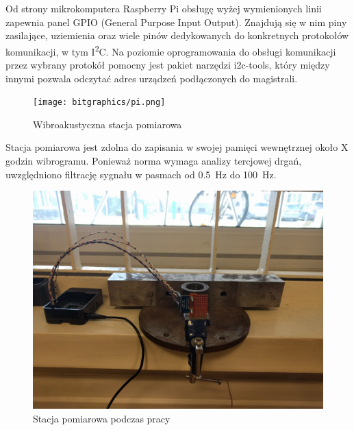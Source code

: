 \documentclass[a4paper,12pt]{mwart}
\begin{document}
Od strony mikrokomputera Raspberry Pi obsługę wyżej wymienionych linii zapewnia
panel GPIO (General Purpose Input Output). Znajdują się w nim piny zasilające,
uziemienia oraz wiele pinów dedykowanych do konkretnych protokołów komunikacji,
w tym I\textsuperscript{2}C. Na poziomie oprogramowania do obsługi komunikacji
przez wybrany protokół pomocny jest pakiet narzędzi
{\fontfamily{\ttdefault}\selectfont i2c-tools}, który między innymi pozwala
odczytać adres urządzeń podłączonych do magistrali.

\begin{figure}[H]
  \centering
  \texttt{[image: bitgraphics/pi.png]}
  \caption{Wibroakustyczna stacja pomiarowa}
  \label{fig:foto}
\end{figure}

Stacja pomiarowa jest zdolna do zapisania w swojej pamięci wewnętrznej około X
godzin wibrogramu. Ponieważ norma wymaga analizy tercjowej drgań, uwzględniono
filtrację sygnału w pasmach od \SI{0,5}{\hertz} do \SI{100}{\hertz}.

\begin{figure}[H]
  \centering
  \includegraphics[width=\textwidth]{bitgraphics/pomiar_1.jpg}
  \caption{Stacja pomiarowa podczas pracy}
  \label{fig:pomiar1}
\end{figure}
\end{document}
